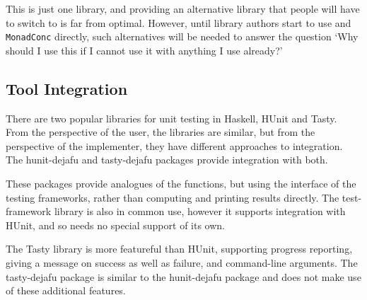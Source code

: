 This is just one library, and providing an alternative library that
people will have to switch to is far from optimal.  However, until
library authors start to use \dejafu{} and \verb|MonadConc| directly,
such alternatives will be needed to answer the question `Why should I
use this if I cannot use it with anything I use already?'

\subsection{Tool Integration}

There are two popular libraries for unit testing in Haskell,
HUnit\cite{hunit} and Tasty\cite{tasty}.  From the perspective of the
user, the libraries are similar, but from the perspective of the
implementer, they have different approaches to integration.  The
hunit-dejafu\cite{hunit_dejafu} and tasty-dejafu\cite{tasty_dejafu}
packages provide integration with both.

These packages provide analogues of the \dejafu{} functions, but using
the interface of the testing frameworks, rather than computing and
printing results directly.  The test-framework\cite{test_framework}
library is also in common use, however it supports integration with
HUnit, and so needs no special support of its own.

The Tasty library is more featureful than HUnit, supporting progress
reporting, giving a message on success as well as failure, and
command-line arguments.  The tasty-dejafu package is similar to the
hunit-dejafu package and does not make use of these additional
features.



